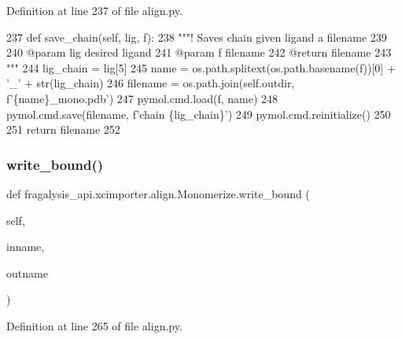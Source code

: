 Definition at line 237 of file align.\+py.


\begin{DoxyCode}
237     \textcolor{keyword}{def }save\_chain(self, lig, f):
238         \textcolor{stringliteral}{"""! Saves chain given ligand a filename}
239 \textcolor{stringliteral}{}
240 \textcolor{stringliteral}{        @param lig desired ligand}
241 \textcolor{stringliteral}{        @param f filename}
242 \textcolor{stringliteral}{        @return filename}
243 \textcolor{stringliteral}{        """}
244         lig\_chain = lig[5]
245         name = os.path.splitext(os.path.basename(f))[0] + \textcolor{stringliteral}{'\_'} + str(lig\_chain)
246         filename = os.path.join(self.outdir, f\textcolor{stringliteral}{'\{name\}\_mono.pdb'})
247         pymol.cmd.load(f, name)
248         pymol.cmd.save(filename, f\textcolor{stringliteral}{'chain \{lig\_chain\}'})
249         pymol.cmd.reinitialize()
250 
251         \textcolor{keywordflow}{return} filename
252 
\end{DoxyCode}
\mbox{\label{classfragalysis__api_1_1xcimporter_1_1align_1_1_monomerize_aa97d5e71f2d0309e12bc4beafa5151fc}} 
\subsubsection{\texorpdfstring{write\+\_\+bound()}{write\_bound()}}
{\footnotesize\ttfamily def fragalysis\+\_\+api.\+xcimporter.\+align.\+Monomerize.\+write\+\_\+bound (\begin{DoxyParamCaption}\item[{}]{self,  }\item[{}]{inname,  }\item[{}]{outname }\end{DoxyParamCaption})}



Definition at line 265 of file align.\+py.


